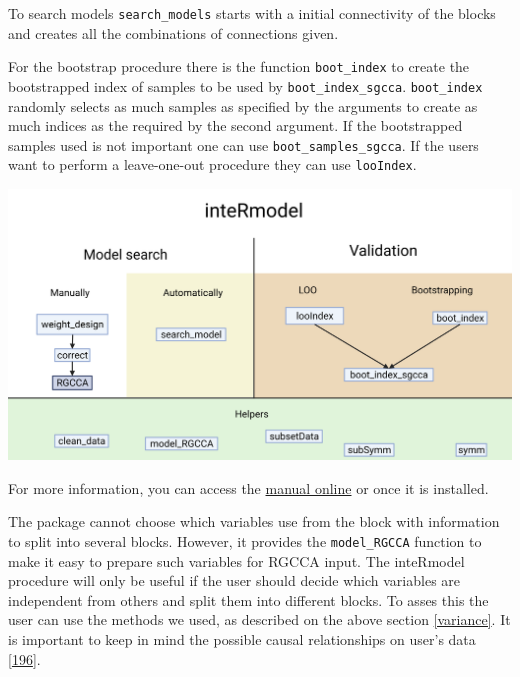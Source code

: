 \documentclass[
  12pt,
  a4paper,
  twoside,
  openright]{book}
\let\origfigure\figure
\let\endorigfigure\endfigure
\renewenvironment{figure}[1][2] {
    \expandafter\origfigure\expandafter[!htbp]
} {
    \endorigfigure
}
\begin{document}
To search models \texttt{search\_models} starts with a initial connectivity of the blocks and creates all the combinations of connections given.

For the bootstrap procedure there is the function \texttt{boot\_index} to create the bootstrapped index of samples to be used by \texttt{boot\_index\_sgcca}.
\texttt{boot\_index} randomly selects as much samples as specified by the arguments to create as much indices as the required by the second argument.
If the bootstrapped samples used is not important one can use \texttt{boot\_samples\_sgcca}.
If the users want to perform a leave-one-out procedure they can use \texttt{looIndex}.

\begin{figure}
\includegraphics[width=1\linewidth]{images/inteRmodel-workflows} \caption[inteRmodel functions and workflow.]{`inteRmodel` functions and workflow. Functions provided by the inteRmodel package to help on the process, search and validate models of relationships using RGCCA. Created with BioRender.com}\label{fig:intermodel-workflows}
\end{figure}

For more information, you can access the \href{https://llrs.github.io/inteRmodel/}{manual online} or once it is installed.

The package cannot choose which variables use from the block with information to split into several blocks.
However, it provides the \texttt{model\_RGCCA} function to make it easy to prepare such variables for RGCCA input.
The inteRmodel procedure will only be useful if the user should decide which variables are independent from others and split them into different blocks.
To asses this the user can use the methods we used, as described on the above section \ref{variance}.
It is important to keep in mind the possible causal relationships on user's data {[}\protect\hyperlink{ref-greenland2002}{196}{]}.
\end{document}
